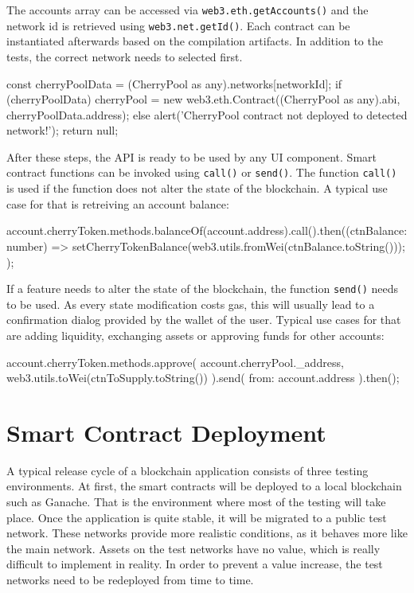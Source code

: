 The accounts array can be accessed via \texttt{web3.eth.getAccounts()} and the network id is retrieved using \texttt{web3.net.getId()}. Each contract can be instantiated afterwards based on the compilation artifacts. In addition to the tests, the correct network needs to selected first.

\begin{GenericCode}
const cherryPoolData = (CherryPool as any).networks[networkId];
if (cherryPoolData) {
  cherryPool = new web3.eth.Contract((CherryPool as any).abi, cherryPoolData.address);
} else {
  alert('CherryPool contract not deployed to detected network!');
  return null;
}	
\end{GenericCode}

After these steps, the API is ready to be used by any UI component. Smart contract functions can be invoked using \texttt{call()} or \texttt{send()}. The function \texttt{call()} is used if the function does not alter the state of the blockchain. A typical use case for that is retreiving an account balance:

\begin{GenericCode}
account.cherryToken.methods.balanceOf(account.address).call().then((ctnBalance: number) => {
  setCherryTokenBalance(web3.utils.fromWei(ctnBalance.toString()));
});
          
\end{GenericCode}

If a feature needs to alter the state of the blockchain, the function \texttt{send()} needs to be used. As every state modification costs gas, this will usually lead to a confirmation dialog provided by the wallet of the user. Typical use cases for that are adding liquidity, exchanging assets or approving funds for other accounts:

\begin{GenericCode}
account.cherryToken.methods.approve(
  account.cherryPool._address,
  web3.utils.toWei(ctnToSupply.toString())
).send({ from: account.address }).then();	
\end{GenericCode}


\section{Smart Contract Deployment}
\label{sec:deployment}

A typical release cycle of a blockchain application consists of three testing environments. At first, the smart contracts will be deployed to a local blockchain such as Ganache\cite{Ganache}. That is the environment where most of the testing will take place. Once the application is quite stable, it will be migrated to a public test network. These networks provide more realistic conditions, as it behaves more like the main network. Assets on the test networks have no value, which is really difficult to implement in reality. In order to prevent a value increase, the test networks need to be redeployed from time to time.

